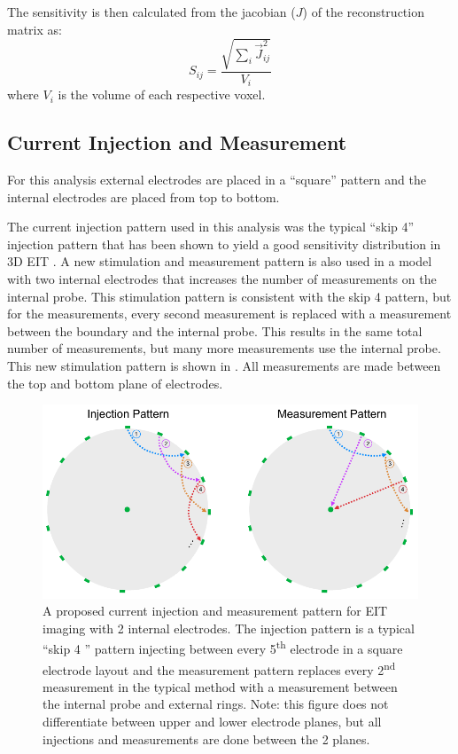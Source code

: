 The sensitivity is then calculated from the jacobian ($J$) of the reconstruction matrix as:
\begin{equation}
	S_{ij} = \frac{\sqrt{\sum_{i}\vec{J}_{ij}^2}}{V_i}
\end{equation}
where $V_i$ is the volume of each respective voxel. 

\subsection{Current Injection and Measurement}
For this analysis external electrodes are placed in 
a ``square'' pattern \parencite{grychtol_3d_2016} 
and the internal electrodes are placed from top to 
bottom. 

The current injection pattern used in this analysis was the 
typical ``skip 4'' injection pattern that has been shown to yield 
a good sensitivity distribution in 3D EIT \parencite{grychtol_3d_2016}.
A new stimulation and measurement pattern is also used in a model with 
two internal electrodes that increases
the number of measurements on the internal probe. This stimulation 
pattern is consistent with the skip 4 pattern, but 
for the measurements, every second measurement
is replaced with a measurement between the boundary and the internal probe. 
This results in the same total number of measurements, but many more measurements
use the internal probe. This new stimulation pattern is shown in . 
All measurements are made between the top and bottom plane of electrodes.

\begin{figure}[H]
\centering
\includegraphics[width=\textwidth]{chapter6-internal_electrodes/imgs/current_injection.pdf}
\caption[Current injection patterns with internal electrodes]{A proposed current injection and measurement pattern for EIT imaging with 2 internal electrodes.
The injection pattern is a typical ``skip 4 '' pattern injecting between every 5\textsuperscript{th} electrode in a square electrode layout and the
measurement pattern replaces every 2\textsuperscript{nd} measurement in the typical method with a measurement between the internal probe and
external rings. Note: this figure does not differentiate between upper and lower electrode planes, but all injections and measurements are done between 
the 2 planes.}
\label{fig:modified_measurement}
\end{figure}

